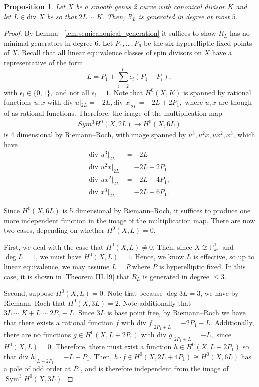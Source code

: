 \documentclass{amsart}
\theoremstyle{plain}
\newtheorem{prop}[thm]{Proposition}
\theoremstyle{definition}
\theoremstyle{remark}
\numberwithin{equation}{section}
\newcommand\BP{{\mathbb P}}
\newcommand \di{\text{div }}
\DeclareMathOperator{\sym}{Sym}
\begin{document}
\begin{prop}
\label{prop:genus_2_generation_5}
Let $X$ be a smooth genus 2 curve with canonical divisor $K$ and let $L \in \di X$ be so that $2L \sim K$. 
Then, $R_L$ is generated in degree at most $5$.
\end{prop}
\begin{proof}
By Lemma ~\ref{lem:semicanonical_generation} it suffices to show $R_L$ has no minimal generators in degree 6.
Let $P_1, \ldots, P_6$ be the six hyperelliptic fixed points of $X$. 
Recall that all linear equivalence classes of spin divisors on $X$ have a representative of the form
$$L = P_1 + \sum_{i =2}^{6} \epsilon_i (P_1 - P_i),$$ 
with $\epsilon_i \in \{0,1\},$ and not all $\epsilon_i = 1$. 
Note that $H^0(X,K)$ is spanned by rational functions $u, x$ with $\di u|_{2L} = -2L, \di x|_{2L} = -2L + 2P_1,$ where $u,x$ are though of as rational functions. Therefore, the image of the multiplication map 
\begin{align*}
	Sym^3 H^0(X,2L) \rightarrow H^0(X,6L)
\end{align*}
is 4 dimensional by Riemann--Roch, with image spanned by $u^3,u^2x,ux^2, x^3$, 
which have 
\begin{align*}
	\di u^3|_{2L} &= -2L \\
	\di u^2x|_{2L} &= -2L + 2P_1 \\
	\di ux^2|_{2L} &= -2L+4P_1, \\
	\di x^3|_{2L} &= -2L + 6P_1.
\end{align*}

\noindent
Since $H^0(X,6L)$ is 5 dimensional by Riemann--Roch,
it suffices to produce one more independent function in the image of the multiplication map.
There are now two cases, depending on whether $H^0(X,L) = 0$.

First, we deal with the case that $H^0(X,L) \neq 0$. 
Then, since $X \not \cong \BP^1_k,$ and $\deg L = 1$, we must have $H^0(X,L) = 1$. Hence, we know $L$ is effective, so up to linear equivalence, we may assume $L = P$ where $P$ is hyperelliptic fixed. In this case, it is shown in \cite{neves:halfcan}[Theorem III.19] that $R_L$ is generated in degree $\leq 3$.

Second, suppose $H^0(X,L) = 0$.
Note that because $\deg 3L = 3$, we have by Riemann--Roch that $H^0(X,3L) = 2$. 
Note additionally that $3L \sim K + L \sim 2P_1 + L$. Since $3L$ is base point free, by Riemann--Roch
we have that there exists a rational function $f$ with $\di f|_{2P_1 + L} = -2P_1 - L.$ Additionally, there are no functions $g \in H^0(X,L + 2P_1)$ 
with $\di g|_{2P_1 + L} = -L,$ since $H^0(X,L) = 0.$ Therefore, there must 
exist a function $h \in H^0(X,L+2P_1)$ so that $\di h|_{L + 2P_1} = -L - P_1$.
Then, $h \cdot f \in H^0(X,2L + 4P_1) \cong H^0(X,6L)$ has a pole of odd 
order at $P_1$, and is therefore independent from the image of $\sym^3 H^0(X,3L)$.
\end{proof}
\end{document}

